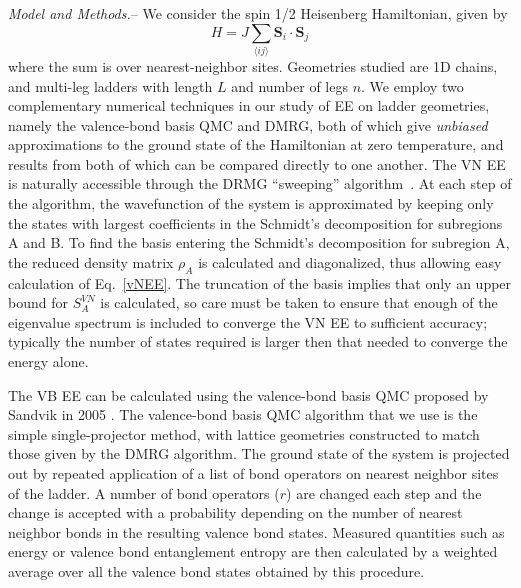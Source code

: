 \documentclass[prl,aps,twocolumn,floatfix,amsmath,amssymb,superscriptaddress,tightenlines]{revtex4}
\begin{document}
{\it Model and Methods.}-- We consider the spin 1/2 Heisenberg
Hamiltonian, given by \begin{equation} H = J \sum_{\langle i j \rangle}
{\mathbf S}_i \cdot {\mathbf S}_j \label{ham} \end{equation} where the sum
is over nearest-neighbor sites.  Geometries studied are 1D chains, and
multi-leg ladders with length $L$ and number of legs $n$.  
We employ two complementary numerical techniques in our study of EE on
ladder geometries, namely the valence-bond basis QMC and DMRG, both of
which give {\it unbiased} approximations to the ground state of the
Hamiltonian at zero temperature, and results from both of which can be
compared directly to one another.  The VN EE is naturally accessible
through the DRMG ``sweeping'' algorithm~\cite{White92, Scholl05}.  At each
step of the algorithm, the wavefunction of the system is approximated by
keeping only the states with largest coefficients in the Schmidt's
decomposition for subregions A and B. To find the basis entering the
Schmidt's decomposition for subregion A, the reduced density matrix
$\rho_A$ is calculated and diagonalized, thus allowing easy calculation
of Eq.~\ref{vNEE}. The truncation of the basis implies that only an upper
bound for $S^{VN}_{A}$ is calculated, so care must be taken to ensure
that enough of the eigenvalue spectrum is included to converge the VN EE
to sufficient accuracy; typically the number of states required is larger
then that needed to converge the energy alone.

The VB EE can be calculated using the valence-bond basis QMC proposed by
Sandvik in 2005 \cite{Sandvik}.  The valence-bond basis QMC algorithm that
we use is the simple single-projector method, with lattice geometries
constructed to match those given by the DMRG algorithm.  The ground state
of the system is projected out by repeated application of a list of bond
operators on nearest neighbor sites of the ladder.  A number of bond
operators ($r$) are changed each step and the change is accepted with a
probability depending on the number of nearest neighbor bonds in the
resulting valence bond states.  Measured quantities such as energy or
valence bond entanglement entropy are then calculated by a weighted
average over all the valence bond states obtained by this procedure.
\end{document}
